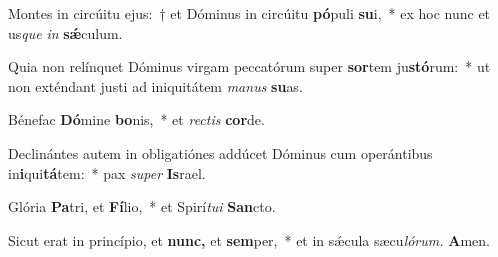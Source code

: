 \item Montes in circúitu ejus:~† et Dóminus in circúitu \textbf{pó}puli \textbf{su}i,~* ex hoc nunc et us\tinyhspace\textit{que} \textit{in} \textbf{sǽ}culum.
\item Quia non relínquet Dóminus virgam peccatórum super \textbf{sor}tem ju\textbf{stó}rum:~* ut non exténdant justi ad iniquitátem \textit{manus} \textbf{su}as.
\item Bénefac \textbf{Dó}mine \textbf{bo}nis,~* et \textit{rectis} \textbf{cor}de.
\item Declinántes autem in obligatiónes addúcet Dóminus cum operántibus in\-\textbf{i}qui\textbf{tá}tem:~* pax \textit{super} \textbf{Is}rael.
\item Glória \textbf{Pa}tri, et \textbf{Fí}lio,~* et Spirí\tinyhspace\textit{tui} \textbf{San}cto.
\item Sicut erat in princípio, et \textbf{nunc,} et \textbf{sem}per,~* et in sǽcula sæcu\textit{lórum.} \textbf{A}men.
